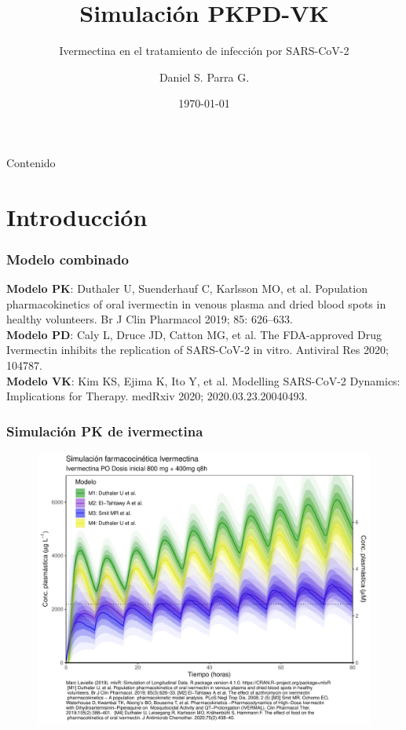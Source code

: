 \documentclass[12pt]{beamer}
\begin{document}
	\author[Daniel Parra]{Daniel S. Parra G.}
	\title{Simulación PKPD-VK}
	\subtitle{Ivermectina en el tratamiento de infección por SARS-CoV-2}
	\date{\today}
	\begin{frame}[plain]
		\maketitle
	\end{frame}
	
	\begin{frame}{Contenido}
		\tableofcontents[currentsection]
	\end{frame}
	
	\section{Introducción}
	\begin{frame}
		\frametitle{Modelo combinado}
		\centering
		
		
		\bigskip
		\parbox[b]{1.0\textwidth}{\tiny \textbf{Modelo PK}: Duthaler U, Suenderhauf C, Karlsson MO, et al. Population pharmacokinetics of oral ivermectin in venous plasma and dried blood spots in healthy volunteers. Br J Clin Pharmacol 2019; 85: 626–633. \\
			\textbf{Modelo PD}: Caly L, Druce JD, Catton MG, et al. The FDA-approved Drug Ivermectin inhibits the replication of SARS-CoV-2 in vitro. Antiviral Res 2020; 104787.\\
			\textbf{Modelo VK}: Kim KS, Ejima K, Ito Y, et al. Modelling SARS-CoV-2 Dynamics: Implications for Therapy. medRxiv 2020; 2020.03.23.20040493.}
	\end{frame}
	
	\begin{frame}
		\frametitle[PK]{Simulación PK de ivermectina}
		\begin{figure}[t]
			\centering
			\label{fig:pk2opcional8}
			\includegraphics[width=0.8\linewidth]{../modelo_pkpd/PK2_opcional8}
		\end{figure}
	\end{frame}
\end{document}
